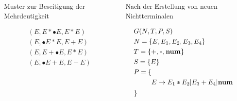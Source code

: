 \documentclass[t]{beamer}
\begin{document}
	\begin{frame}
		\vspace{-1em}
		\begin{columns}[T]
			\begin{column}{0.33\textwidth}
				\centering
				\begin{block}{Muster zur Beseitigung der Mehrdeutigkeit}
					\begin{minipage}[t][7.5cm]{\linewidth}
						\vspace{-1em}
						\begin{align*}
						(E, E*\bullet{E}, E*E)
							\\
							(E, \bullet{E}*E, E+E) \\
							(E, E+\bullet{E}, E*E) \\
							(E, \bullet{E}+E, E+E)
						\end{align*}
					\end{minipage}
				\end{block}
			\end{column}
			\begin{column}{0.45\textwidth}
				\centering
				\begin{block}{Nach der Erstellung von neuen Nichtterminalen}
					\begin{minipage}[t]{\linewidth}
						\vspace{-1em}
						\begin{align*}
							& G(N,T,P,S) \\
							& N = \{E, E_1, E_2, E_3, E_4\} \\
							& T = \{+, *, \bold{num}\} \\
							& S = \{E\} \\
							& P = \{ \begin{aligned}[t]
								         \\
								         E &\rightarrow E_1 * E_2 | E_3 + E_4 | \bold{num} \\
							\end{aligned} \\
							& \}
						\end{align*}
					\end{minipage}
				\end{block}
			\end{column}
		\end{columns}
	\end{frame}
\end{document}
